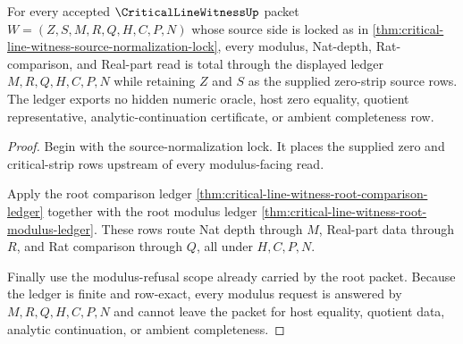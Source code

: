 \begin{theorem}
\label{thm:critical-line-witness-modulus-ledger-totality}
For every accepted $\CriticalLineWitnessUp$ packet $W=(Z,S,M,R,Q,H,C,P,N)$ whose source side is locked as in \autoref{thm:critical-line-witness-source-normalization-lock}, every modulus, Nat-depth, Rat-comparison, and Real-part read is total through the displayed ledger $M,R,Q,H,C,P,N$ while retaining $Z$ and $S$ as the supplied zero-strip source rows. The ledger exports no hidden numeric oracle, host zero equality, quotient representative, analytic-continuation certificate, or ambient completeness row.
\end{theorem}
\begin{proof}
Begin with the source-normalization lock. It places the supplied zero and critical-strip rows upstream of every modulus-facing read.

Apply the root comparison ledger \autoref{thm:critical-line-witness-root-comparison-ledger} together with the root modulus ledger \autoref{thm:critical-line-witness-root-modulus-ledger}. These rows route Nat depth through $M$, Real-part data through $R$, and Rat comparison through $Q$, all under $H,C,P,N$.

Finally use the modulus-refusal scope already carried by the root packet. Because the ledger is finite and row-exact, every modulus request is answered by $M,R,Q,H,C,P,N$ and cannot leave the packet for host equality, quotient data, analytic continuation, or ambient completeness.
\end{proof}

